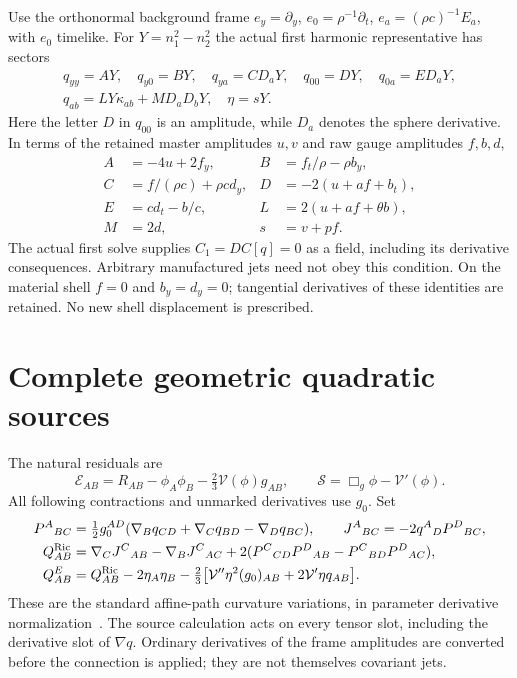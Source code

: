 \documentclass[11pt]{article}
\begin{document}
Use the orthonormal background frame $e_y=\partial_y$,
$e_0=\rho^{-1}\partial_t$, $e_a=(\rho c)^{-1}E_a$, with $e_0$ timelike.
For $Y=n_1^2-n_2^2$ the actual first harmonic representative has sectors
\begin{equation}
 \begin{gathered}
 q_{yy}=AY,\quad q_{y0}=BY,\quad q_{ya}=C D_aY,\quad
 q_{00}=DY,\quad q_{0a}=E D_aY,\\
 q_{ab}=LY\kappa_{ab}+M D_aD_bY,\quad \eta=sY.
 \end{gathered}
 \label{eq:amplitudes}
\end{equation}
Here the letter $D$ in $q_{00}$ is an amplitude, while $D_a$ denotes the
sphere derivative. In terms of the retained master amplitudes $u,v$ and raw
gauge amplitudes $f,b,d$,
\begin{align}
 A&=-4u+2f_y,& B&=f_t/\rho-\rho b_y,\\
 C&=f/(\rho c)+\rho c d_y,& D&=-2(u+af+b_t),\\
 E&=c d_t-b/c,& L&=2(u+af+\theta b),\\
 M&=2d,& s&=v+pf.
\end{align}
The actual first solve supplies $C_1=DC[q]=0$ as a field, including its
derivative consequences. Arbitrary manufactured jets need not obey this
condition. On the material shell $f=0$ and $b_y=d_y=0$; tangential derivatives
of these identities are retained. No new shell displacement is prescribed.

\section{Complete geometric quadratic sources}

The natural residuals are
\begin{equation}
 \mathscr E_{AB}=R_{AB}-\phi_A\phi_B-\tfrac23\mathcal V(\phi)g_{AB},
 \qquad \mathscr S=\Box_g\phi-\mathcal V'(\phi).
\end{equation}
All following contractions and unmarked derivatives use $g_0$. Set
\begin{align}
 P^A{}_{BC}&=\tfrac12g_0^{AD}
 (\nabla_Bq_{CD}+\nabla_Cq_{BD}-\nabla_Dq_{BC}),\qquad
 J^A{}_{BC}=-2q^A{}_D P^D{}_{BC},\\
 Q^{\rm Ric}_{AB}&=\nabla_CJ^C{}_{AB}-\nabla_BJ^C{}_{AC}
 +2(P^C{}_{CD}P^D{}_{AB}-P^C{}_{BD}P^D{}_{AC}),\\
 Q^E_{AB}&=Q^{\rm Ric}_{AB}-2\eta_A\eta_B
 -\tfrac23\big[\mathcal V''\eta^2(g_0)_{AB}
                     +2\mathcal V'\eta q_{AB}\big].
 \label{eq:QE}
\end{align}
These are the standard affine-path curvature variations, in parameter
derivative normalization~\cite{bmm2006,xpert}. The source calculation acts
on every tensor slot, including the derivative slot of $\nabla q$.
Ordinary derivatives of the frame amplitudes are converted before the
connection is applied; they are not themselves covariant jets.
\end{document}
